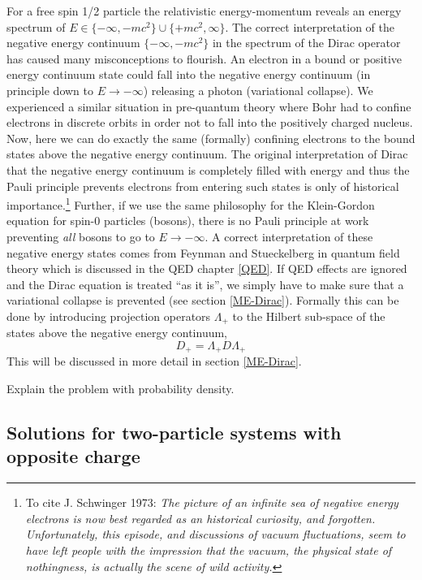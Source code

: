 \documentclass[12pt]{article}
\begin{document}
For a free spin 1/2 particle the relativistic energy-momentum reveals an energy spectrum of $E\in\{-\infty,-mc^2\}\cup\{+mc^2,\infty\}$. The correct interpretation of the negative energy continuum $\{-\infty,-mc^2\}$ in the spectrum of the Dirac operator has caused many misconceptions to flourish. An electron in a bound or positive energy continuum state could fall into the negative energy continuum (in principle down to $E\rightarrow -\infty$) releasing a photon (variational collapse). We experienced a similar situation in pre-quantum theory where Bohr had to confine electrons in discrete orbits in order not to fall into the positively charged nucleus. Now, here we can do exactly the same (formally) confining electrons to the bound states above the negative energy continuum. The original interpretation of Dirac that the negative energy continuum is completely filled with energy and thus the Pauli principle prevents electrons from entering such states is only of historical importance.\footnote{To cite J. Schwinger 1973: \it The picture of an infinite sea of negative energy electrons is now best regarded as an historical curiosity, and forgotten. Unfortunately, this episode, and discussions of vacuum fluctuations, seem to have left people with the impression that the vacuum, the physical state of nothingness, is actually the scene of wild activity.} Further, if we use the same philosophy for the Klein-Gordon equation for spin-0 particles (bosons), there is no Pauli principle at work preventing {\it all} bosons to go to $E\rightarrow -\infty$. A correct interpretation of these negative energy states comes from Feynman and Stueckelberg in quantum field theory which is discussed in the QED chapter \ref{QED}. If QED effects are ignored and the Dirac equation is treated ``as it is'', we simply have to make sure that a variational collapse is prevented (see section \ref{ME-Dirac}). Formally this can be done by introducing projection operators $\Lambda_{+}$ to the Hilbert sub-space of the states above the negative energy continuum,
\begin{equation}
   D_{+} = \Lambda_{+} D \Lambda_{+}
   \label{DiracBS}
\end{equation}
This will be discussed in more detail in section \ref{ME-Dirac}.

Explain the problem with probability density.

\subsection{\sffamily Solutions for two-particle systems with opposite charge}
\end{document}
